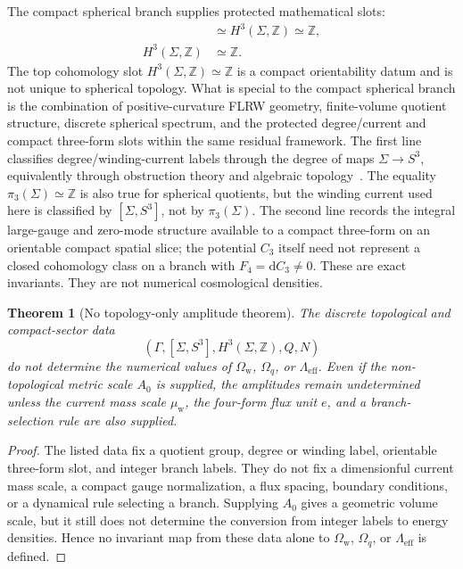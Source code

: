 \documentclass[
  aps,
  prd,
  reprint,
  superscriptaddress,
  floatfix,
  nofootinbib,
  longbibliography
]{revtex4-2}
\theoremstyle{plain}
\newtheorem{theorem}{Theorem}
\theoremstyle{definition}
\theoremstyle{remark}
\newcommand{\dd}{\mathrm d}
\newcommand{\w}{\mathrm w}
\newcommand{\eff}{\mathrm{eff}}
\newcommand{\Ow}{\Omega_{\mathrm w}}
\newcommand{\Oq}{\Omega_q}
\newcommand{\Z}{\mathbb Z}
\begin{document}
The compact spherical branch supplies protected mathematical slots:
\begin{align}
[\Sigma,S^3]&\simeq H^3(\Sigma,\Z)\simeq\Z,
\label{eq:protected_slots}\\
H^3(\Sigma,\Z)&\simeq \Z .
\nonumber
\end{align}
The top cohomology slot \(H^3(\Sigma,\Z)\simeq\Z\) is a compact orientability
datum and is not unique to spherical topology.  What is special to the compact
spherical branch is the combination of positive-curvature FLRW geometry,
finite-volume quotient structure, discrete spherical spectrum, and the protected
degree/current and compact three-form slots within the same residual framework.
The first line classifies degree/winding-current labels through the degree of
maps \(\Sigma\to S^3\), equivalently through obstruction theory and algebraic
topology~\cite{Hatcher}.  The equality
\(\pi_3(\Sigma)\simeq\Z\) is also true for spherical quotients, but the winding
current used here is classified by \([\Sigma,S^3]\), not by \(\pi_3(\Sigma)\).
The second line records the integral large-gauge and zero-mode structure
available to a compact three-form on an orientable compact spatial slice; the
potential \(C_3\) itself need not represent a closed cohomology class on a
branch with \(F_4=\dd C_3\neq0\).  These are exact invariants.  They are not
numerical cosmological densities.

\begin{theorem}[No topology-only amplitude theorem]
The discrete topological and compact-sector data
\[
(\Gamma,[\Sigma,S^3],H^3(\Sigma,\Z),Q,N)
\]
do not determine the numerical values of \(\Ow\), \(\Oq\), or
\(\Lambda_{\eff}\).  Even if the non-topological metric scale \(A_0\) is supplied, the
amplitudes remain undetermined unless the current mass scale \(\mu_{\w}\), the
four-form flux unit \(e\), and a branch-selection rule are also supplied.
\end{theorem}

\begin{proof}
The listed data fix a quotient group, degree or winding label, orientable
three-form slot, and integer branch labels.  They do not fix a dimensionful
current mass scale, a compact gauge normalization, a flux spacing, boundary
conditions, or a dynamical rule selecting a branch.  Supplying \(A_0\) gives a
geometric volume scale, but it still does not determine the conversion from
integer labels to energy densities.  Hence no invariant map from these data
alone to \(\Ow\), \(\Oq\), or \(\Lambda_{\eff}\) is defined.
\end{proof}
\end{document}
